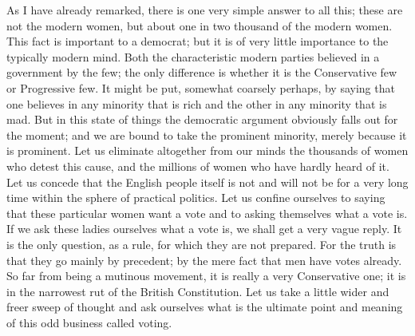 \documentclass{book}
\begin{document}
As I have already remarked, there is one very simple answer to all this; these are not the modern women, but about one in two thousand of the modern women. This fact is important to a democrat; but it is of very little importance to the typically modern mind. Both the characteristic modern parties believed in a government by the few; the only difference is whether it is the Conservative few or Progressive few. It might be put, somewhat coarsely perhaps, by saying that one believes in any minority that is rich and the other in any minority that is mad. But in this state of things the democratic argument obviously falls out for the moment; and we are bound to take the prominent minority, merely because it is prominent. Let us eliminate altogether from our minds the thousands of women who detest this cause, and the millions of women who have hardly heard of it. Let us concede that the English people itself is not and will not be for a very long time within the sphere of practical politics. Let us confine ourselves to saying that these particular women want a vote and to asking themselves what a vote is. If we ask these ladies ourselves what a vote is, we shall get a very vague reply. It is the only question, as a rule, for which they are not prepared. For the truth is that they go mainly by precedent; by the mere fact that men have votes already. So far from being a mutinous movement, it is really a very Conservative one; it is in the narrowest rut of the British Constitution. Let us take a little wider and freer sweep of thought and ask ourselves what is the ultimate point and meaning of this odd business called voting.
\end{document}
